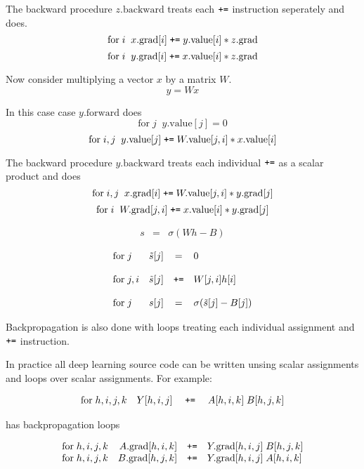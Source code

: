 {\vfill
The backward procedure $z.\mathrm{backward}$ treats each $\mbox{\tt +=}$ instruction seperately and does.
$$\mathrm{for}\;i\;\;x.\mathrm{grad}[i] \;\mbox{\tt +=}\;y.\mathrm{value}[i]*z.\mathrm{grad}$$
$$\mathrm{for}\;i\;\;y.\mathrm{grad}[i] \;\mbox{\tt +=}\;x.\mathrm{value}[i]*z.\mathrm{grad}$$

Now consider multiplying a vector $x$ by a matrix $W$.
$$y = Wx$$

\vfill
In this case case $y.\mathrm{forward}$ does
$$\mathrm{for}\;j\;\;y.\mathrm{value}[j] = 0$$
$$\mathrm{for}\;i,j\;\;y.\mathrm{value}[j] \;\mbox{\tt +=}\;W.\mathrm{value}[j,i]*x.\mathrm{value}[i]$$

\vfill
The backward procedure $y.\mathrm{backward}$ treats each individual $\mbox{\tt +=}$ as a scalar product and does
$$\mathrm{for}\;i,j\;\;x.\mathrm{grad}[i] \;\mbox{\tt +=}\;W.\mathrm{value}[j,i]*y.\mathrm{grad}[j]$$
$$\mathrm{for}\;i\;\;W.\mathrm{grad}[j,i] \;\mbox{\tt +=}\;x.\mathrm{value}[i]*y.\mathrm{grad}[j]$$


\begin{eqnarray*}
   s & = & \sigma\left(Wh - B \right)
\end{eqnarray*}

$$\begin{array}{lrcl}
\mathrm{for}\;j &  \tilde{s}[j] & = & 0 \\
\\
\mathrm{for}\;j,i &  \tilde{s}[j] & \mbox{\tt +=} &  W[j,i]h[i] \\
\\
\mathrm{for}\; j & s[j] & = & \sigma(\tilde{s}[j] - B[j])
\end{array}$$

\vfill
Backpropagation is also done with loops treating each individual assignment and $\mbox{\tt +=}$ instruction.


In practice all deep learning source code can be written unsing scalar assignments and loops over scalar assignments.
For example:

$$\begin{array}{rrcl}
\mathrm{for}\; h,i,j,k & Y[h,i,j] & \;\mbox{\tt +=}\; & A[h,i,k]\;B[h,j,k] \\
\end{array}$$

\vfill
has backpropagation loops

$$\begin{array}{rrcl}
\mathrm{for}\;h,i,j,k & A.\mathrm{grad}[h,i,k] & \mbox{\tt +=} & Y.\mathrm{grad}[h,i,j] \;B[h,j,k] \\
\mathrm{for}\;h,i,j,k & B.\mathrm{grad}[h,j,k] & \mbox{\tt +=} & Y.\mathrm{grad}[h,i,j]\;A[h,i,k]
\end{array}$$

}



